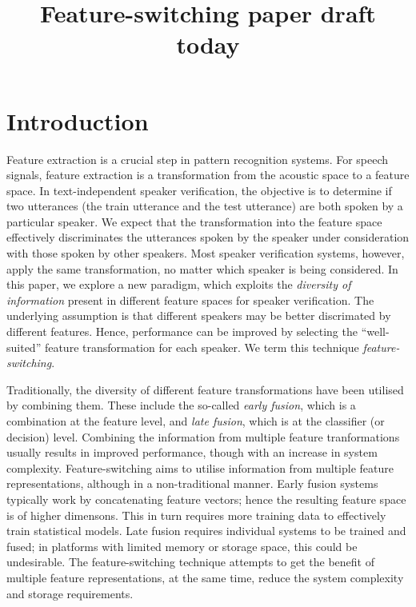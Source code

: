 \documentclass{article}
\title{Feature-switching paper draft today}
\begin{document}
\section{Introduction}
Feature extraction is a crucial step in pattern recognition systems. For
speech signals, feature extraction is a transformation from the acoustic space
to a feature space. In text-independent speaker verification, the objective is
to determine if two utterances (the train utterance and the test utterance) are
both spoken by a particular speaker. We expect that the transformation into the
feature space effectively discriminates the utterances spoken by the speaker
under consideration with those spoken by other speakers. Most speaker
verification systems, however, apply the same transformation, no matter which
speaker is being considered. In this paper, we explore a new paradigm, which
exploits the \emph{diversity of information} present in different feature spaces
for speaker verification. The underlying assumption is that different speakers
may be better discrimated by different features. Hence, performance can
be improved by selecting the ``well-suited'' feature transformation for
each speaker. We term this technique \emph{feature-switching}. 

Traditionally, the diversity of different feature transformations have been
utilised by combining them. These include the so-called \emph{early fusion},
which is a combination at the feature level, and \emph{late fusion}, which is at
the classifier (or decision) level. Combining the information from multiple
feature tranformations usually results in improved performance, though
with an increase in system complexity. Feature-switching aims to utilise
information from multiple feature representations, although in a non-traditional
manner. Early fusion systems typically work by concatenating feature vectors;
hence the resulting feature space is of higher dimensons. This in turn requires
more training data to effectively train statistical models. Late fusion requires
individual systems to be trained and fused; in platforms with limited memory or
storage space, this could be undesirable. The feature-switching technique
attempts to get the benefit of multiple feature representations, at the same
time, reduce the system complexity and storage requirements.
\end{document}

